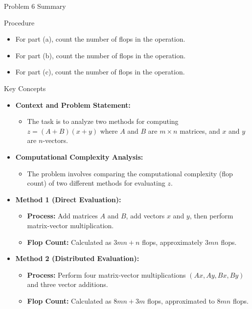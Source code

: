 \begin{summary}{Problem 6 Summary}
    \begin{statement}{Procedure}
        \begin{itemize}
            \item For part (a), count the number of flops in the operation.
            \item For part (b), count the number of flops in the operation.
            \item For part (c), count the number of flops in the operation.
        \end{itemize}
    \end{statement}
    \begin{statement}{Key Concepts}
        \begin{itemize}
            \item \textbf{Context and Problem Statement:}
            \begin{itemize}
                \item The task is to analyze two methods for computing $z = (A + B)(x + y)$ where $A$ and $B$ are $m \times n$ matrices, and $x$ and $y$ are $n$-vectors.
            \end{itemize}
            \item \textbf{Computational Complexity Analysis:}
            \begin{itemize}
                \item The problem involves comparing the computational complexity (flop count) of two different methods for evaluating $z$.
            \end{itemize}
            \item \textbf{Method 1 (Direct Evaluation):}
            \begin{itemize}
                \item \textbf{Process:} Add matrices $A$ and $B$, add vectors $x$ and $y$, then perform matrix-vector multiplication.
                \item \textbf{Flop Count:} Calculated as $3mn + n$ flops, approximately $3mn$ flops.
            \end{itemize}
            \item \textbf{Method 2 (Distributed Evaluation):}
            \begin{itemize}
                \item \textbf{Process:} Perform four matrix-vector multiplications $(Ax, Ay, Bx, By)$ and three vector additions.
                \item \textbf{Flop Count:} Calculated as $8mn + 3m$ flops, approximated to $8mn$ flops.

\end{itemize}
\end{itemize}
\end{statement}
\end{summary}
